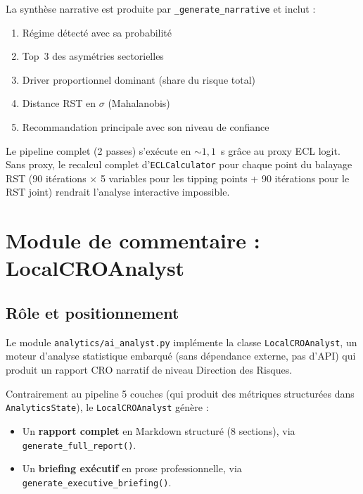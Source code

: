 \documentclass[12pt,a4paper]{article}
\begin{document}
La synth\`ese narrative est produite par \texttt{\_generate\_narrative} et inclut :

\begin{enumerate}[nosep]
    \item R\'egime d\'etect\'e avec sa probabilit\'e
    \item Top~3 des asym\'etries sectorielles
    \item Driver proportionnel dominant (share du risque total)
    \item Distance RST en $\sigma$ (Mahalanobis)
    \item Recommandation principale avec son niveau de confiance
\end{enumerate}

\begin{warningbox}[Performance]
Le pipeline complet (2 passes) s'ex\'ecute en $\sim 1{,}1$~s gr\^ace au proxy ECL logit.
Sans proxy, le recalcul complet d'\texttt{ECLCalculator} pour chaque point du balayage RST
(90 it\'erations $\times$ 5 variables pour les tipping points + 90 it\'erations pour le RST
joint) rendrait l'analyse interactive impossible.
\end{warningbox}


\newpage
\section{Module de commentaire : LocalCROAnalyst}

\subsection{R\^ole et positionnement}

Le module \texttt{analytics/ai\_analyst.py} impl\'emente la classe
\texttt{LocalCROAnalyst}, un moteur d'analyse statistique embarqu\'e (sans d\'ependance
externe, pas d'API) qui produit un rapport CRO narratif de niveau Direction des Risques.

Contrairement au pipeline 5 couches (qui produit des m\'etriques structur\'ees dans
\texttt{AnalyticsState}), le \texttt{LocalCROAnalyst} g\'en\`ere :

\begin{itemize}
    \item Un \textbf{rapport complet} en Markdown structur\'e (8 sections), via
          \texttt{generate\_full\_report()}.
    \item Un \textbf{briefing ex\'ecutif} en prose professionnelle, via
          \texttt{generate\_executive\_briefing()}.
\end{itemize}
\end{document}
